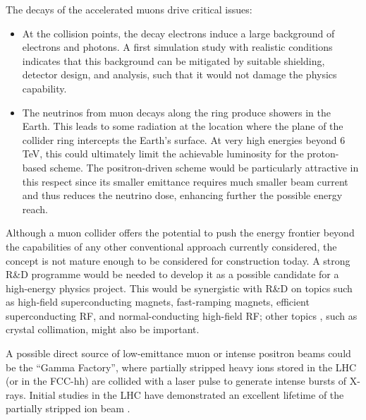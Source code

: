 The decays of the accelerated muons drive critical issues:
\begin{itemize}
\item	
At the collision points, the decay electrons induce a large background of electrons and photons. A first simulation study with realistic conditions indicates that this background can be mitigated by suitable shielding, detector design, and analysis, such that it would not damage the physics capability.
\item	
The neutrinos from muon decays along the ring produce showers in the Earth. This leads to some radiation at the location where the plane of the collider ring intercepts the Earth's surface. At very high energies beyond 6 TeV, this could ultimately limit the achievable luminosity for the proton-based scheme. The positron-driven scheme would be particularly attractive in this respect since its smaller emittance requires much smaller beam current and thus reduces the neutrino dose, enhancing further the possible energy reach.
\end{itemize}


Although a muon collider offers the potential to push the energy frontier beyond the capabilities of any other conventional approach currently considered, the concept is not mature enough to be considered for construction today. A strong R\&D programme would be needed to develop it as a possible candidate for a high-energy physics project. This would be synergistic with R\&D on topics such as high-field superconducting magnets, fast-ramping magnets, efficient superconducting RF, and normal-conducting high-field RF; other topics , such as crystal collimation, might also be important.

A possible direct source of low-emittance muon or intense positron beams could be the ``Gamma Factory'', where partially stripped heavy ions stored in the LHC (or in the FCC-hh) are collided with a laser pulse to generate intense bursts of X-rays.  Initial studies in the LHC have demonstrated an excellent lifetime of the partially stripped ion beam \cite{id6}.

